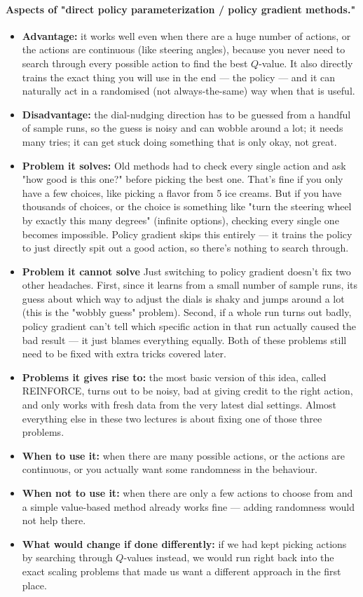\documentclass[11pt]{article}
\begin{document}
\paragraph{Aspects of "direct policy parameterization / policy gradient methods."}
\begin{itemize}[leftmargin=*]
  \item \textbf{Advantage:} it works well even when there are a huge number of actions, or the actions are continuous (like steering angles), because you never need to search through every possible action to find the best $Q$-value. It also directly trains the exact thing you will use in the end --- the policy --- and it can naturally act in a randomised (not always-the-same) way when that is useful.
  \item \textbf{Disadvantage:} the dial-nudging direction has to be guessed from a handful of sample runs, so the guess is noisy and can wobble around a lot; it needs many tries; it can get stuck doing something that is only okay, not great.
  \item \textbf{Problem it solves:} Old methods had to check every single action and ask "how good is this one?" before picking the best one. That's fine if you only have a few choices, like picking a flavor from 5 ice creams. But if you have thousands of choices, or the choice is something like "turn the steering wheel by exactly this many degrees" (infinite options), checking every single one becomes impossible. Policy gradient skips this entirely — it trains the policy to just directly spit out a good action, so there's nothing to search through.
  \item \textbf{Problem it cannot solve} Just switching to policy gradient doesn't fix two other headaches. First, since it learns from a small number of sample runs, its guess about which way to adjust the dials is shaky and jumps around a lot (this is the "wobbly guess" problem). Second, if a whole run turns out badly, policy gradient can't tell which specific action in that run actually caused the bad result — it just blames everything equally. Both of these problems still need to be fixed with extra tricks covered later.
  \item \textbf{Problems it gives rise to:} the most basic version of this idea, called REINFORCE, turns out to be noisy, bad at giving credit to the right action, and only works with fresh data from the very latest dial settings. Almost everything else in these two lectures is about fixing one of those three problems.
  \item \textbf{When to use it:} when there are many possible actions, or the actions are continuous, or you actually want some randomness in the behaviour.
  \item \textbf{When not to use it:} when there are only a few actions to choose from and a simple value-based method already works fine --- adding randomness would not help there.
  \item \textbf{What would change if done differently:} if we had kept picking actions by searching through $Q$-values instead, we would run right back into the exact scaling problems that made us want a different approach in the first place.
\end{itemize}
\end{document}
